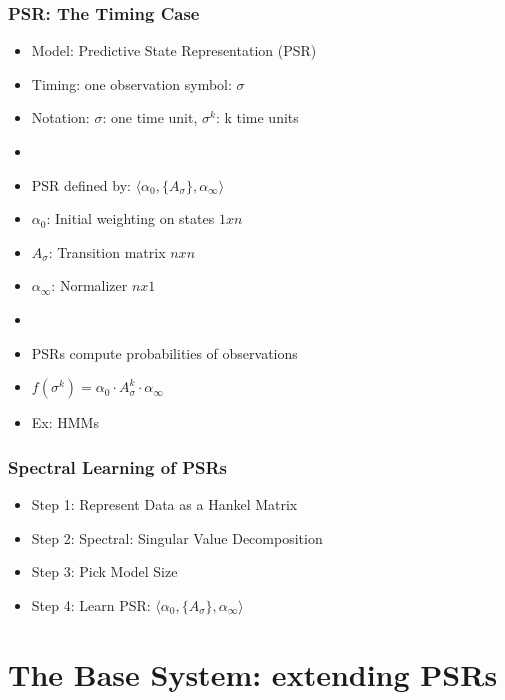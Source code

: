 \documentclass{beamer}
\begin{document}
\begin{frame}
\frametitle{PSR: The Timing Case}

\begin{itemize}
\item Model: Predictive State Representation (PSR)
\item[] Timing: one observation symbol: {$\sigma$}
\item[] Notation: $\sigma$: one time unit, $\sigma^k$: k time units
\item[]
\item PSR defined by: $\langle \alpha_0, \{A_\sigma\},\alpha_\infty \rangle$
\item[] $\alpha_0$: Initial weighting on states $1xn$
\item[] $A_\sigma$: Transition matrix $nxn$
\item[] $\alpha_\infty$: Normalizer $nx1$
\item[]
\item PSRs compute probabilities of observations

\item[] $f(\sigma^k) = \alpha_0 \cdot A_\sigma^k \cdot \alpha_\infty$
\item[] Ex: HMMs
\end{itemize}

\end{frame}


\begin{frame}
\frametitle{Spectral Learning of PSRs}

\begin{itemize}
\item[] Step 1: Represent Data as a Hankel Matrix
\item[] Step 2: Spectral: Singular Value Decomposition
\item[] Step 3: Pick Model Size
\item[] Step 4: Learn PSR: $\langle \alpha_0, \{A_\sigma\},\alpha_\infty \rangle$ 
\end{itemize}

\end{frame}

\section{The Base System: extending PSRs}
\end{document}
